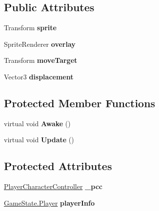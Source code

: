 \subsection*{Public Attributes}
\begin{DoxyCompactItemize}
\item 
\hypertarget{class_player_reference_a32979ccda155fe50f781e80c8bcfc5bd}{Transform {\bfseries sprite}}\label{class_player_reference_a32979ccda155fe50f781e80c8bcfc5bd}

\item 
\hypertarget{class_player_reference_a46a995f93fe98882b1a79d57b0baa66b}{Sprite\-Renderer {\bfseries overlay}}\label{class_player_reference_a46a995f93fe98882b1a79d57b0baa66b}

\item 
\hypertarget{class_player_reference_accd3ff8958657fee1e45aeb824b3e8e2}{Transform {\bfseries move\-Target}}\label{class_player_reference_accd3ff8958657fee1e45aeb824b3e8e2}

\item 
\hypertarget{class_player_reference_a82f0857be7511d86e4b417e96a11a5fd}{Vector3 {\bfseries displacement}}\label{class_player_reference_a82f0857be7511d86e4b417e96a11a5fd}

\end{DoxyCompactItemize}
\subsection*{Protected Member Functions}
\begin{DoxyCompactItemize}
\item 
\hypertarget{class_player_reference_adce9feacb370df0b0ea95754376aec04}{virtual void {\bfseries Awake} ()}\label{class_player_reference_adce9feacb370df0b0ea95754376aec04}

\item 
\hypertarget{class_player_reference_ad75981d8a0e56d56370a27b9fcca1e91}{virtual void {\bfseries Update} ()}\label{class_player_reference_ad75981d8a0e56d56370a27b9fcca1e91}

\end{DoxyCompactItemize}
\subsection*{Protected Attributes}
\begin{DoxyCompactItemize}
\item 
\hypertarget{class_player_reference_ae076e8379386c67d01beb3d76c3b4600}{\hyperlink{class_player_character_controller}{Player\-Character\-Controller} {\bfseries \-\_\-pcc}}\label{class_player_reference_ae076e8379386c67d01beb3d76c3b4600}

\item 
\hypertarget{class_player_reference_abffbcb7165e1d2fbb37b536d87eca369}{\hyperlink{class_game_state_1_1_player}{Game\-State.\-Player} {\bfseries player\-Info}}\label{class_player_reference_abffbcb7165e1d2fbb37b536d87eca369}

\end{DoxyCompactItemize}
